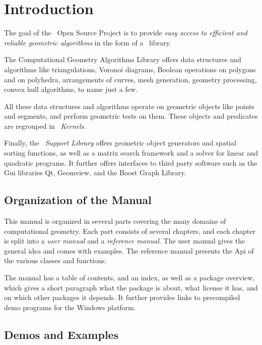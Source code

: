 
\chapter{Introduction}



The goal of the \cgal\ Open Source Project is to provide 
{\em easy access to efficient and reliable geometric algorithms}
in the form of a \CC\ library.

The Computational Geometry Algorithms Library offers data
structures and algorithms like 
triangulations,
Voronoi diagrams,
Boolean operations on polygons and on polyhedra,
arrangements of curves,
mesh generation,
geometry processing,
convex hull algorithms,
to name just a few.


All these data structures and algorithms operate on geometric objects
like points and segments, and perform geometric tests on them.
These objects and predicates are regrouped in \cgal\ {\em Kernels}.


Finally, the  \cgal\ {\em Support Library}
offers geometric object generators and spatial sorting functions,  
as well as a matrix search framework and a solver for linear and quadratic programs. 
It further offers interfaces to third party software such as the {\sc Gui} libraries Qt, 
Geomview, and the Boost Graph Library.


\section{Organization of the Manual}

This manual is organized in several parts covering the many domains
of computational geometry. Each part consists of several chapters,
and each chapter is split into a {\em user manual}  and a {\em reference
manual}. The user manual gives the general idea and comes with examples.
The reference manual presents the {\sc Api} of the various classes
and functions.

The manual has a table of contents, and an index, as well as a package overview,
which gives a short paragraph what the package is about, what license
it has, and on which other packages it depends. It further provides
links to precompiled demo programs for the Windows platform.

\section{Demos and Examples}

